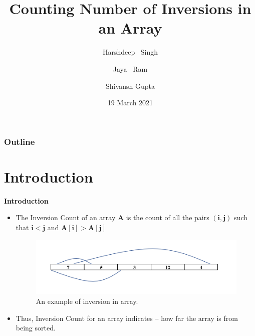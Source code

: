 \documentclass{beamer}
\title{Counting Number of Inversions in an Array}
\author {Harshdeep ~Singh\inst{1}  \and Jaya ~Ram\inst{2}  \and Shivansh Gupta\inst{3}}
\institute{
\inst{1} IIT2019105 \hspace{5pt}
\inst{2} IIT2019106 \hspace{5pt}
\inst{3} IIT2019107 \hspace{5pt}\\
(Batch 2, Group 3)
}
\date{19 March 2021}
\begin{document}
\begin{frame}
  \titlepage
\end{frame}

\begin{frame}
\frametitle{Outline}
\tableofcontents
\end{frame}

\section{Introduction}
\begin{frame}{\textbf{Introduction}}
\begin{itemize}
    \item The Inversion Count of an array \textbf{A} is the count of all the pairs $\bm{(i,j)}$ such that $\bm{i}<\bm{j}$ and $\bm{A[i]}>\bm{A[j]}$ \\
    
    \begin{figure}[htbp]
    \centerline{\includegraphics{inversion.png}}
    \caption{An example of inversion in array.}
    \label{fig}
    \end{figure}
    
    \item Thus, Inversion Count for an array indicates – how far the array is from being sorted.\\
\end{itemize}
\end{frame}
\end{document}
